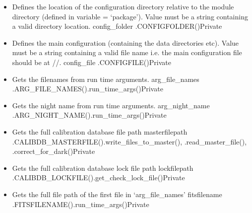 \begin{itemize}


\item {}
{Defines the location of the configuration directory relative to the module directory (defined in variable = `package'). Value must be a string containing a valid directory location.}
{config\_folder}{\configdirrelpath}
{\AllRecipes}{\spirouCONST.CONFIGFOLDER()}{\AllRecipes}{Private}


\item {}
{Defines the main configuration (containing the data directories etc).  Value must be a string containing a valid file name i.e. the main configuration file should be at //.}
{config\_file}{\configtxtfile}
{\AllRecipes}{\spirouCONST.CONFIGFILE()}{\AllRecipes}{Private}


\item {}
{Gets the filenames from run time arguments.}
{arg\_file\_names}
{\AllRecipes}{\spirouCONST.ARG\_FILE\_NAMES()}{\spirouStartup.run\_time\_args()}{Private}


\item {}
{Gets the night name from run time arguments.}
{arg\_night\_name}
{\AllRecipes}{\spirouCONST.ARG\_NIGHT\_NAME()}{\spirouStartup.run\_time\_args()}{Private}


\item {}
{Gets the full calibration database file path}
{masterfilepath}
{\AllRecipes}{\spirouCONST.CALIBDB\_MASTERFILE()}{\spirouCDB.write\_files\_to\_master(), \spirouCDB.read\_master\_file(), \spirouImage.correct\_for\_dark()}{Private}


\item {}
{Gets the full calibration database lock file path}
{lockfilepath}
{\AllRecipes}{\spirouCONST.CALIBDB\_LOCKFILE()}{\spirouCDB.get\_check\_lock\_file()}{Private}


\item {}
{Gets the full file path of the first file in `arg\_file\_names'}
{fitsfilename}
{\AllRecipes}{\spirouCONST.FITSFILENAME()}{\spirouStartup.run\_time\_args()}{Private}



\end{itemize}
